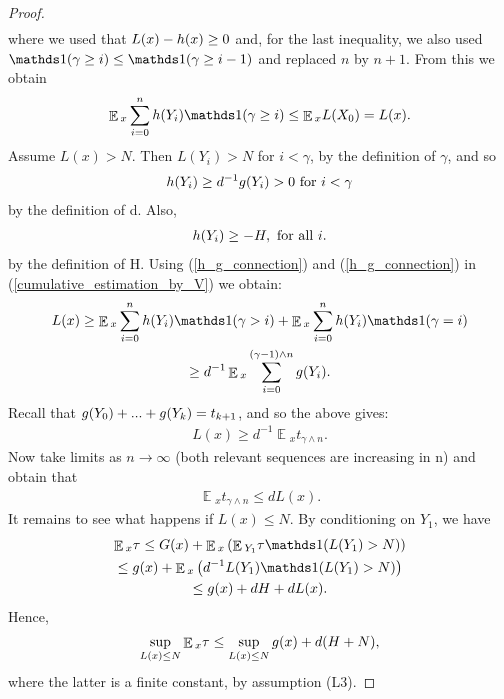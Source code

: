 \documentclass[10pt, reqno]{amsart}
\theoremstyle{definition}
\newcommand{\astVar}{\tau} %
\newcommand{\gtfVar}{G} %
\newcommand{\ltfVar}{L} %
\DeclareMathOperator*{\E}{\mathbb{E}}
\begin{document}
\begin{proof}
\begin{gather*}
		\end{gather*}
		where we used that $\ltfVar(x) - \hffVar(x) \geq 0$ and, for the last inequality, we also used $\indicator(\gamma \geq i) \leq \indicator(\gamma \geq i - 1)$ and replaced $n$ by $n+1$. From this we obtain
		\begin{gather}
			\E{}_{x}\sum_{i=0}^{n}\hffVar(Y_{i})\indicator(\gamma \geq i) \leq \E{}_{x}\ltfVar(X_{0}) = \ltfVar(x).
			\label{cumulative_estimation_by_V}
		\end{gather}
		Assume $\ltfVar(x) > N$. Then $\ltfVar(Y_{i}) > N$ for $i < \gamma$, by the definition of $\gamma$, and so
		\begin{gather}
			h(Y_{i}) \geq d^{-1}g(Y_{i}) > 0 \text{ for } i < \gamma
			\label{h_g_connection}
		\end{gather}
		by the definition of d. Also,
		\begin{gather}
			h(Y_{i}) \geq -H, \text{ for all } i.
			\label{h_estimation}
		\end{gather}
		by the definition of H. Using (\ref{h_g_connection}) and (\ref{h_g_connection}) in (\ref{cumulative_estimation_by_V}) we obtain:
		\begin{gather*}
			\ltfVar(x) \geq \E{}_{x}\sum_{i=0}^{n}\hffVar(Y_{i})\indicator(\gamma > i) + \E{}_{x}\sum_{i=0}^{n}\hffVar(Y_{i})\indicator(\gamma = i) \\ \geq d^{-1}\E{}_{x}\sum_{i=0}^{(\gamma - 1) \wedge n}\gffVar(Y_{i}).
		\end{gather*}
		Recall that $g(Y_{0}) + ... + g(Y_{k}) = t_{k+1}$, and so the above gives:
		\begin{gather*}
			\ltfVar(x) \geq d^{-1}\E{}_{x}t_{\gamma \wedge n}.
		\end{gather*}
		Now take limits as $n \xrightarrow{} \infty$ (both relevant sequences are increasing in n) and obtain that
		\begin{gather*}
			\E{}_{x}t_{\gamma \wedge n} \leq d\ltfVar(x).
		\end{gather*}
		It remains to see what happens if $\ltfVar(x) \leq N$. By conditioning on $Y_{1}$, we have
		\begin{gather*}
			\E{}_{x}\astVar \leq \gtfVar(x) + \E{}_{x}\left(\E{}_{Y_{1}}\astVar\indicator(\ltfVar(Y_{1}) > N)\right) \\ \leq \gffVar(x) + \E{}_{x}\left(d^{-1}\ltfVar(Y_{1})\indicator(\ltfVar(Y_{1}) > N)\right) \\ \leq \gffVar(x) + dH + d\ltfVar(x).
		\end{gather*}
		Hence,
		\begin{gather*}
			\sup_{\ltfVar(x) \leq N}\E{}_{x}\astVar \leq \sup_{\ltfVar(x) \leq N}\gffVar(x) + d(H +N),
		\end{gather*}
		where the latter is a finite constant, by assumption (L3).
	\end{proof}
	
\end{document}
